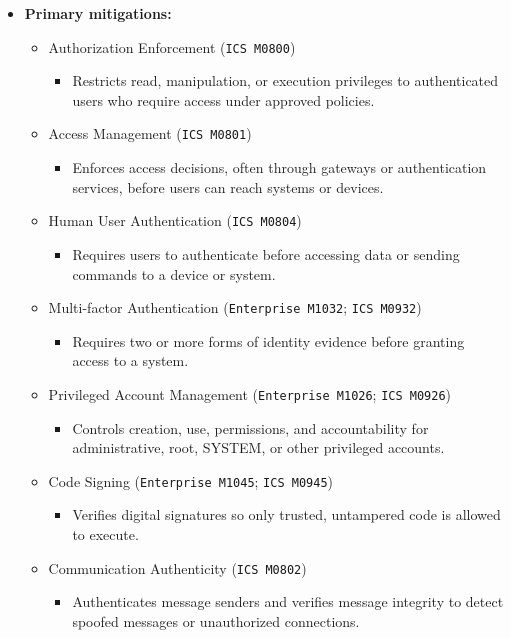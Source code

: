 \documentclass[10pt,a4paper,oneside]{report}
\begin{document}
\begin{itemize}
\item \textbf{Primary mitigations:}
\begin{itemize}
\item Authorization Enforcement (\texttt{ICS M0800})
\begin{itemize}
\item Restricts read, manipulation, or execution privileges to authenticated users who require access under approved policies.
\end{itemize}
\item Access Management (\texttt{ICS M0801})
\begin{itemize}
\item Enforces access decisions, often through gateways or authentication services, before users can reach systems or devices.
\end{itemize}
\item Human User Authentication (\texttt{ICS M0804})
\begin{itemize}
\item Requires users to authenticate before accessing data or sending commands to a device or system.
\end{itemize}
\item Multi-factor Authentication (\texttt{Enterprise M1032}; \texttt{ICS M0932})
\begin{itemize}
\item Requires two or more forms of identity evidence before granting access to a system.
\end{itemize}
\item Privileged Account Management (\texttt{Enterprise M1026}; \texttt{ICS M0926})
\begin{itemize}
\item Controls creation, use, permissions, and accountability for administrative, root, SYSTEM, or other privileged accounts.
\end{itemize}
\item Code Signing (\texttt{Enterprise M1045}; \texttt{ICS M0945})
\begin{itemize}
\item Verifies digital signatures so only trusted, untampered code is allowed to execute.
\end{itemize}
\item Communication Authenticity (\texttt{ICS M0802})
\begin{itemize}
\item Authenticates message senders and verifies message integrity to detect spoofed messages or unauthorized connections.

\end{itemize}
\end{itemize}
\end{itemize}
\end{document}

